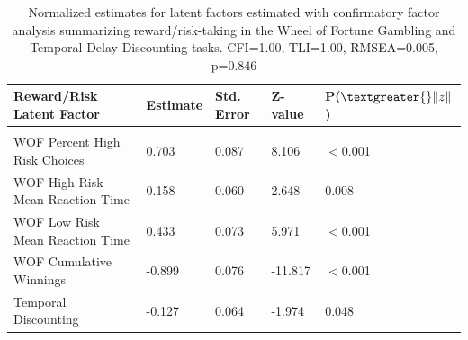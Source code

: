 \documentclass{article}%
\begin{document}
\begin{table}[h!]
\begin{tabular}{lllll}
Reward/Risk Latent Factor                                               & Estimate & Std. Error & Z-value & P($\textgreater{}\|z\|$) \\ \hline \\
WOF Percent High Risk Choices                 & 0.703    & 0.087      & 8.106  & $<$0.001                \\ 
WOF High Risk Mean Reaction Time                  & 0.158   & 0.060      & 2.648  & 0.008            \\ 
WOF Low Risk Mean Reaction Time                   & 0.433    & 0.073      & 5.971   & $<$0.001                \\ 
WOF Cumulative Winnings                                & -0.899   & 0.076      & -11.817 & $<$0.001                \\ 
Temporal Discounting                                           & -0.127   & 0.064      & -1.974  & 0.048 \\ 
\end{tabular}
\caption{Normalized estimates for latent factors estimated with confirmatory factor analysis summarizing reward/risk-taking in the Wheel of Fortune Gambling and Temporal Delay Discounting tasks. CFI=1.00, TLI=1.00, RMSEA=0.005, p=0.846 \label{tab:3}}
\end{table}
\end{document}
